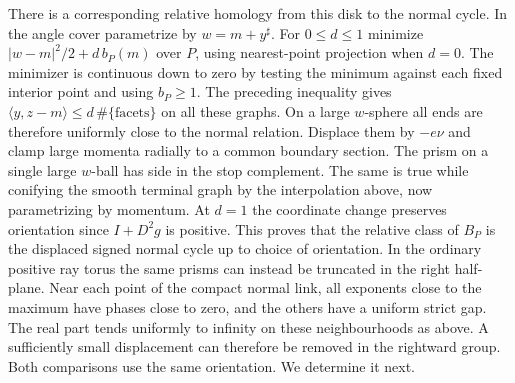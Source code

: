 There is a corresponding relative homology from this disk to the normal cycle. In the angle cover parametrize by $w=m+y^\sharp$. For $0\le d\le1$ minimize $|w-m|^2/2+d\,b_P(m)$ over $P$, using nearest-point projection when $d=0$. The minimizer is continuous down to zero by testing the minimum against each fixed interior point and using $b_P\ge1$. The preceding inequality gives $\langle y,z-m\rangle\le d\,\#\{\text{facets}\}$ on all these graphs. On a large $w$-sphere all ends are therefore uniformly close to the normal relation. Displace them by $-e\nu$ and clamp large momenta radially to a common boundary section. The prism on a single large $w$-ball has side in the stop complement. The same is true while conifying the smooth terminal graph by the interpolation above, now parametrizing by momentum. At $d=1$ the coordinate change preserves orientation since $I+D^2g$ is positive. This proves that the relative class of $B_P$ is the displaced signed normal cycle up to choice of orientation. In the ordinary positive ray torus the same prisms can instead be truncated in the right half-plane. Near each point of the compact normal link, all exponents close to the maximum have phases close to zero, and the others have a uniform strict gap. The real part tends uniformly to infinity on these neighbourhoods as above. A sufficiently small displacement can therefore be removed in the rightward group. Both comparisons use the same orientation. We determine it next.
